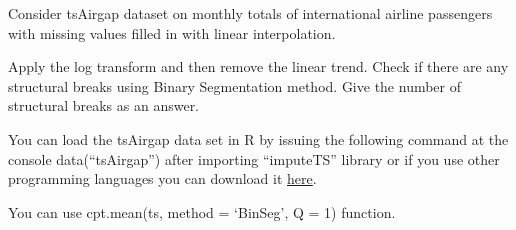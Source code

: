 
\begin{question}
Consider tsAirgap dataset on monthly totals of international airline passengers with missing values filled in with linear interpolation.

Apply the log transform and then remove the linear trend. Check if there are any structural breaks using Binary Segmentation method. Give the number of structural breaks as an answer.

You can load the tsAirgap data set in R by issuing the following command at the console data(``tsAirgap'') after importing ``imputeTS'' library or if you use other programming languages you can download it \href{https://github.com/SteffenMoritz/imputeTS/blob/master/data/tsAirgap.rda}{here}.
\end{question}

\begin{solution}
You can use cpt.mean(ts, method = `BinSeg', Q = 1) function.
\end{solution}

